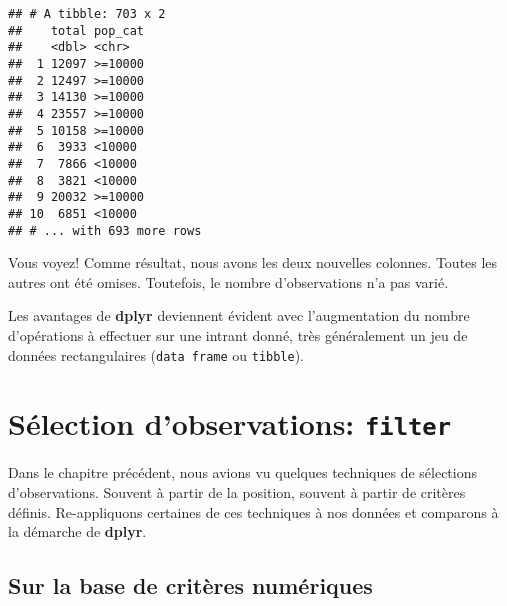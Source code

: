 \documentclass[]{book}
\newenvironment{Shaded}{\begin{snugshade}}{\end{snugshade}}
\newcommand{\KeywordTok}[1]{\textcolor[rgb]{0.13,0.29,0.53}{\textbf{#1}}}
\newcommand{\DataTypeTok}[1]{\textcolor[rgb]{0.13,0.29,0.53}{#1}}
\newcommand{\DecValTok}[1]{\textcolor[rgb]{0.00,0.00,0.81}{#1}}
\newcommand{\StringTok}[1]{\textcolor[rgb]{0.31,0.60,0.02}{#1}}
\newcommand{\CommentTok}[1]{\textcolor[rgb]{0.56,0.35,0.01}{\textit{#1}}}
\newcommand{\OperatorTok}[1]{\textcolor[rgb]{0.81,0.36,0.00}{\textbf{#1}}}
\newcommand{\NormalTok}[1]{#1}
\begin{document}
\begin{Shaded}
\end{Shaded}

\begin{verbatim}
## # A tibble: 703 x 2
##    total pop_cat
##    <dbl> <chr>  
##  1 12097 >=10000
##  2 12497 >=10000
##  3 14130 >=10000
##  4 23557 >=10000
##  5 10158 >=10000
##  6  3933 <10000 
##  7  7866 <10000 
##  8  3821 <10000 
##  9 20032 >=10000
## 10  6851 <10000 
## # ... with 693 more rows
\end{verbatim}

Vous voyez! Comme résultat, nous avons les deux nouvelles colonnes.
Toutes les autres ont été omises. Toutefois, le nombre d'observations
n'a pas varié.

Les avantages de \textbf{dplyr} deviennent évident avec l'augmentation
du nombre d'opérations à effectuer sur une intrant donné, très
généralement un jeu de données rectangulaires (\texttt{data\ frame} ou
\texttt{tibble}).

\section{\texorpdfstring{Sélection d'observations:
\texttt{filter}}{Sélection d'observations: filter}}\label{selection-dobservations-filter}

Dans le chapitre précédent, nous avions vu quelques techniques de
sélections d'observations. Souvent à partir de la position, souvent à
partir de critères définis. Re-appliquons certaines de ces techniques à
nos données et comparons à la démarche de \textbf{dplyr}.

\subsection{Sur la base de critères
numériques}\label{sur-la-base-de-criteres-numeriques}
\end{document}
